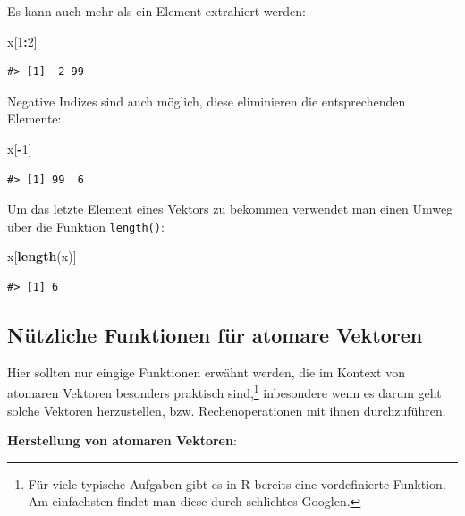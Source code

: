 \documentclass[]{book}
\newenvironment{Shaded}{\begin{snugshade}}{\end{snugshade}}
\newcommand{\KeywordTok}[1]{\textcolor[rgb]{0.13,0.29,0.53}{\textbf{#1}}}
\newcommand{\DecValTok}[1]{\textcolor[rgb]{0.00,0.00,0.81}{#1}}
\newcommand{\OperatorTok}[1]{\textcolor[rgb]{0.81,0.36,0.00}{\textbf{#1}}}
\newcommand{\NormalTok}[1]{#1}
\let\rmarkdownfootnote\footnote%
\def\footnote{\protect\rmarkdownfootnote}
\begin{document}
Es kann auch mehr als ein Element extrahiert werden:

\begin{Shaded}
\begin{Highlighting}[]
\NormalTok{x[}\DecValTok{1}\OperatorTok{:}\DecValTok{2}\NormalTok{]}
\end{Highlighting}
\end{Shaded}

\begin{verbatim}
#> [1]  2 99
\end{verbatim}

Negative Indizes sind auch möglich, diese eliminieren die entsprechenden
Elemente:

\begin{Shaded}
\begin{Highlighting}[]
\NormalTok{x[}\OperatorTok{-}\DecValTok{1}\NormalTok{]}
\end{Highlighting}
\end{Shaded}

\begin{verbatim}
#> [1] 99  6
\end{verbatim}

Um das letzte Element eines Vektors zu bekommen verwendet man einen
Umweg über die Funktion \texttt{length()}:

\begin{Shaded}
\begin{Highlighting}[]
\NormalTok{x[}\KeywordTok{length}\NormalTok{(x)]}
\end{Highlighting}
\end{Shaded}

\begin{verbatim}
#> [1] 6
\end{verbatim}

\subsection{Nützliche Funktionen für atomare
Vektoren}\label{nutzliche-funktionen-fur-atomare-vektoren}

Hier sollten nur eingige Funktionen erwähnt werden, die im Kontext von
atomaren Vektoren besonders praktisch sind,\footnote{Für viele typische
  Aufgaben gibt es in R bereits eine vordefinierte Funktion. Am
  einfachsten findet man diese durch schlichtes Googlen.} inbesondere
wenn es darum geht solche Vektoren herzustellen, bzw. Rechenoperationen
mit ihnen durchzuführen.

\textbf{Herstellung von atomaren Vektoren}:
\end{document}
